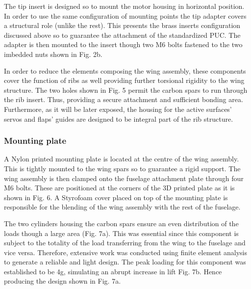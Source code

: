 \documentclass[../../main.tex]{subfiles}
\begin{document}
The tip insert is designed so to mount the motor housing in horizontal position.
In order to use the same configuration of mounting points the tip adapter covers a structural role (unlike the rest).
This presents the brass inserts configuration discussed above so to guarantee the attachment of the standardized PUC.
The adapter is then mounted to the insert though two M6 bolts fastened to the two imbedded nuts shown in Fig. 2b. 

In order to reduce the elements composing the wing assembly, these components cover the function of ribs as well providing further torsional rigidity to the wing structure.
The two holes shown in Fig. 5 permit the carbon spars to run through the rib insert.
Thus, providing a secure attachment and sufficient bonding area.
Furthermore, as it will be later exposed, the housing for the active surfaces’ servos and flaps’ guides are designed to be integral part of the rib structure. 

\subsubsection{Mounting plate} \label{sec:design-process:final-design-proposal:wing:mounting-plate}

A Nylon printed mounting plate is located at the centre of the wing assembly.
This is tightly mounted to the wing spars so to guarantee a rigid support.
The wing assembly is then clamped onto the fuselage attachment plate through four M6 bolts.
These are positioned at the corners of the 3D printed plate as it is shown in Fig. 6.
A Styrofoam cover placed on top of the mounting plate is responsible for the blending of the wing assembly with the rest of the fuselage. 


The two cylinders housing the carbon spars ensure an even distribution of the loads though a large area (Fig. 7a).
This was essential since this component is subject to the totality of the load transferring from the wing to the fuselage and vice versa.
Therefore, extensive work was conducted using finite element analysis to generate a reliable and light design.
The peak loading for this component was established to be 4g, simulating an abrupt increase in lift Fig. 7b.
Hence producing the design shown in Fig. 7a. 

\end{document}
